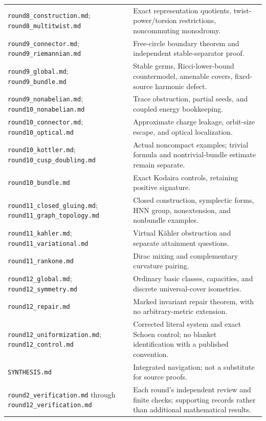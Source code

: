 \documentclass[11pt]{article}
\theoremstyle{definition}\newtheorem{problem}[theorem]{Open problem}
\theoremstyle{remark}\newtheorem{remark}[theorem]{Scope}
\numberwithin{equation}{section}
\begin{document}
\begin{longtable}{L{.34\textwidth}L{.57\textwidth}}
\nolinkurl{round8_construction.md}; \nolinkurl{round8_multitwist.md} & Exact representation quotients, twist-power/torsion restrictions, noncommuting monodromy.\\
\nolinkurl{round9_connector.md}; \nolinkurl{round9_riemannian.md} & Free-circle boundary theorem and independent stable-separator proof.\\
\nolinkurl{round9_global.md}; \nolinkurl{round9_bundle.md} & Stable germs, Ricci-lower-bound countermodel, amenable covers, fixed-source harmonic defect.\\
\nolinkurl{round9_nonabelian.md}; \nolinkurl{round10_nonabelian.md} & Trace obstruction, partial seeds, and coupled energy bookkeeping.\\
\nolinkurl{round10_connector.md}; \nolinkurl{round10_optical.md} & Approximate charge leakage, orbit-size escape, and optical localization.\\
\nolinkurl{round10_kottler.md}; \nolinkurl{round10_cusp_doubling.md} & Actual noncompact examples; trivial formula and nontrivial-bundle estimate remain separate.\\
\nolinkurl{round10_bundle.md} & Exact Kodaira controls, retaining positive signature.\\
\nolinkurl{round11_closed_gluing.md}; \nolinkurl{round11_graph_topology.md} & Closed construction, symplectic forms, HNN group, nonextension, and nonbundle examples.\\
\nolinkurl{round11_kahler.md}; \nolinkurl{round11_variational.md} & Virtual K\"ahler obstruction and separate attainment questions.\\
\nolinkurl{round11_rankone.md} & Dirac mixing and complementary curvature pairing.\\
\nolinkurl{round12_global.md}; \nolinkurl{round12_symmetry.md} & Ordinary basic classes, capacities, and discrete universal-cover isometries.\\
\nolinkurl{round12_repair.md} & Marked invariant repair theorem, with no arbitrary-metric extension.\\
\nolinkurl{round12_uniformization.md}; \nolinkurl{round12_control.md} & Corrected literal system and exact Schoen control; no blanket identification with a published convention.\\
\nolinkurl{SYNTHESIS.md} & Integrated navigation; not a substitute for source proofs.\\
\nolinkurl{round2_verification.md} through \nolinkurl{round12_verification.md} & Each round's independent review and finite checks; supporting records rather than additional mathematical results.\\
\bottomrule
\end{longtable}
\end{document}
